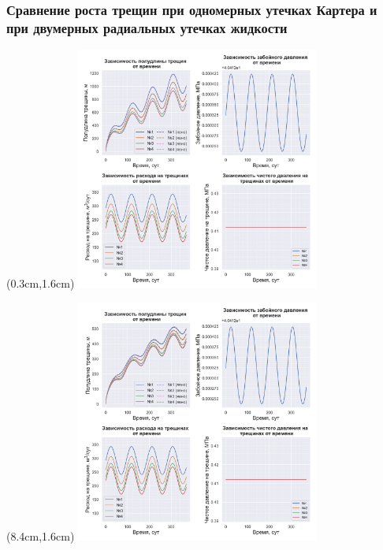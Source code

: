 \documentclass{beamer}
\begin{document}
\begin{frame}
\frametitle{Сравнение роста трещин при одномерных утечках Картера и при двумерных радиальных утечках жидкости}

\begin{textblock*}{8cm}(0.3cm,1.6cm)
\includegraphics[width=8cm]{myimage3.jpg}
\end{textblock*}

\begin{textblock*}{8cm}(8.4cm,1.6cm)
%
  {\includegraphics[width=8cm]{myimage4.jpg}}
\end{textblock*}

\end{frame}
\end{document}
